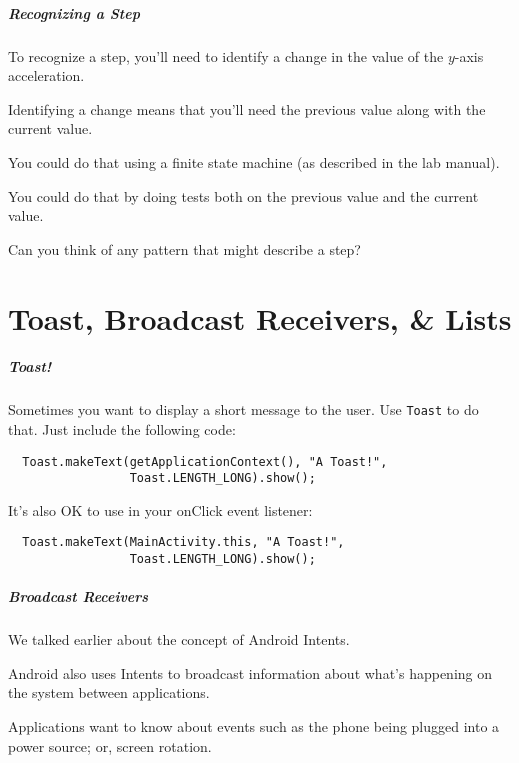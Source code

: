 \begin{frame}
\frametitle{Recognizing a Step}
\begin{changemargin}{1cm}

To recognize a step, you'll need to identify a change in the value of the $y$-axis
acceleration. 

Identifying a change means that you'll need the previous value along
with the current value. 

You could do that using a finite state machine (as described
in the lab manual). 

You could do that by doing tests both on the previous value 
and the current value. 

Can you think of any pattern that might describe a step?

\end{changemargin}
\end{frame}


\part{Toast, Broadcast Receivers, \& Lists}
\frame{\partpage}

\begin{frame}[fragile]
\frametitle{Toast!}
\begin{changemargin}{1cm}

 Sometimes you want to display a short message to the user.
Use {\tt Toast} to do that. Just include the following code:
\begin{verbatim}
  Toast.makeText(getApplicationContext(), "A Toast!", 
                 Toast.LENGTH_LONG).show();
\end{verbatim}
It's also OK to use in your onClick event listener:
\begin{verbatim}
  Toast.makeText(MainActivity.this, "A Toast!", 
                 Toast.LENGTH_LONG).show();
\end{verbatim}


\end{changemargin}
\end{frame}


\begin{frame}
\frametitle{Broadcast Receivers}
\begin{changemargin}{1cm}

We talked earlier about the concept of Android Intents.

Android also uses Intents to broadcast information about what's
happening on the system between applications. 

Applications want to
know about events such as the phone being plugged into a power source;
or, screen rotation.


\end{changemargin}
\end{frame}


